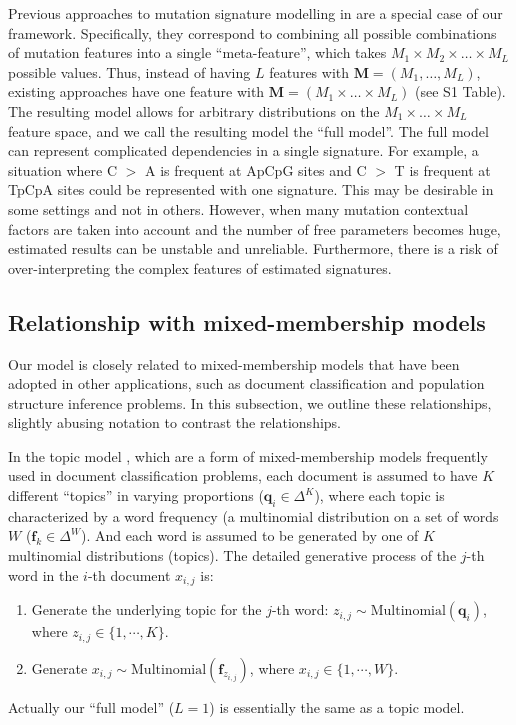 \documentclass[10pt,letterpaper]{article}
\begin{document}
Previous approaches to mutation signature modelling in \cite{pmid23945592, pmid23318258} are a special case of our framework. Specifically, they correspond to combining
all possible combinations of mutation features into a single ``meta-feature'', which takes $M_1 \times M_2 \times \dots \times M_L$ possible values.
Thus, instead of having $L$ features with $\bm{M} = (M_1,\dots,M_L)$,
existing approaches have one feature with $\bm{M} = (M_1 \times \dots \times M_L)$ (see S1 Table). 
The resulting model allows for arbitrary distributions on the $M_1 \times \dots \times M_L$
feature space, and we call the resulting model the ``full model''.
The full model can represent complicated dependencies in a single
signature. For example,
a situation where C $>$ A is frequent at ApCpG sites and C $>$ T is frequent at TpCpA sites could be represented with one signature.
This may be desirable in some settings and not in others.
However, when many mutation contextual factors are taken into account and the number of free parameters becomes huge,
estimated results can be unstable and unreliable.
Furthermore, there is a risk of over-interpreting the complex features of estimated signatures.




\subsection*{Relationship with mixed-membership models}

Our model is closely related to
mixed-membership models that have been adopted in other applications, 
such as document classification and population structure inference problems. 
In this subsection, we outline these relationships,
slightly abusing notation to contrast the relationships. 

In the topic model \cite{Hofmann:1999,Blei:2003},
which are a form of mixed-membership models frequently used in document classification problems,
each document is assumed to have $K$ different ``topics'' in varying proportions ($\bm{q}_i \in \Delta^K$),
where each topic is characterized by a word frequency (a multinomial distribution on a set of words $W$ ($\bm{f}_k \in \Delta^W$).
And each word is assumed to be generated by one of $K$ multinomial distributions (topics).
The detailed generative process of the $j$-th word in the $i$-th document $x_{i,j}$ is:  
\begin{enumerate}
\item
Generate the underlying topic for the $j$-th word: $z_{i,j} \sim \text{Multinomial} (\bm{q}_i)$, where $z_{i,j} \in \{1,\cdots,K \}$.
\item
Generate $x_{i,j} \sim \text{Multinomial} (\bm{f}_{z_{i,j}})$, where $x_{i,j} \in \{1, \cdots, W \}$.
\end{enumerate}
Actually our ``full model'' ($L=1$) is essentially the same as a topic model. 
\end{document}
